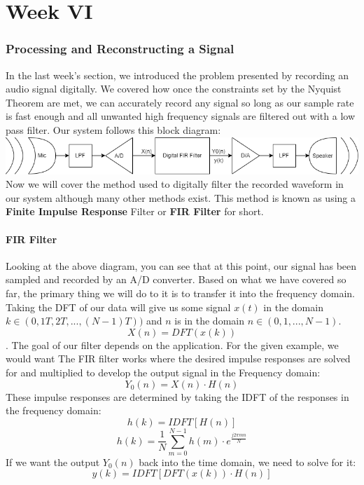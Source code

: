\documentclass[12pt]{article}
\newcommand{\partcontent}{}
\begin{document}
\noindent\makebox[\linewidth]{\rule{\paperwidth}{0.4pt}}

\part*{Week VI}
\renewcommand\partcontent{Week VI}
\section{Processing and Reconstructing a Signal}
In the last week's section, we introduced the problem presented by recording an audio signal digitally. We covered how once the constraints set by the Nyquist Theorem are met, we can accurately record any signal so long as our sample rate is fast enough and all unwanted high frequency signals are filtered out with a low pass filter. Our system follows this block diagram:\\ \includegraphics[scale=0.53]{cdRecordSys_source}
\\ Now we will cover the method used to digitally filter the recorded waveform in our system although many other methods exist. This method is known as using a \textbf{Finite Impulse Response} Filter or \textbf{FIR Filter} for short. 
\\

\subsection{FIR Filter}
Looking at the above diagram, you can see that at this point, our signal has been sampled and recorded by an A/D converter. Based on what we have covered so far, the primary thing we will do to it is to transfer it into the frequency domain. Taking the DFT of our data will give us some signal $x(t)$ in the domain $k \in (0,1T,2T,...,(N-1)T) )$ and $n$ is in the domain $n \in ({0, 1, ..., N-1}) $. $$ X(n) = DFT(x(k))$$. 
The goal of our filter depends on the application. For the given example, we would want  The FIR filter works where the desired impulse responses are solved for and multiplied to develop the output signal in the Frequency domain: $$Y_0(n) = X(n)\cdot H(n)$$
These impulse responses are determined by taking the IDFT of the responses in the frequency domain: $$h(k) = IDFT[H(n)] $$ $$ h(k) = \frac{1}{N} \sum_{m=0}^{N-1} h(m)\cdot e^{\frac{j2\pi mn}{N}} $$ If we want the output $Y_0(n)$ back into the time domain, we need to solve for it: $$y(k) = IDFT[DFT(x(k))\cdot H(n)]$$ 
\end{document}
